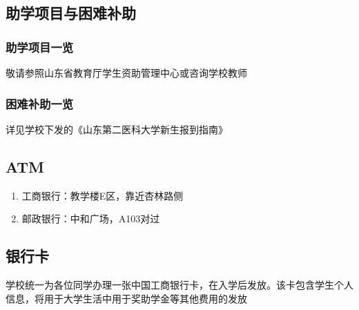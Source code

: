 \subsection[助学项目与困难补助]{助学项目与困难补助}
\subsubsection[助学项目一览]{助学项目一览}
敬请参照山东省教育厅学生资助管理中心或咨询学校教师
\subsubsection[困难补助一览]{困难补助一览}
详见学校下发的《山东第二医科大学新生报到指南》

\subsection[ATM]{ATM\footnotemark}
\begin{enumerate}
    \item 工商银行：教学楼E区，靠近杏林路侧
    \item 邮政银行：中和广场，A103对过
\end{enumerate}

\subsection[银行卡]{银行卡}
学校统一为各位同学办理一张中国工商银行卡，在入学后发放。该卡包含学生个人信息，将用于大学生活中用于奖助学金等其他费用的发放

\textbf{}
